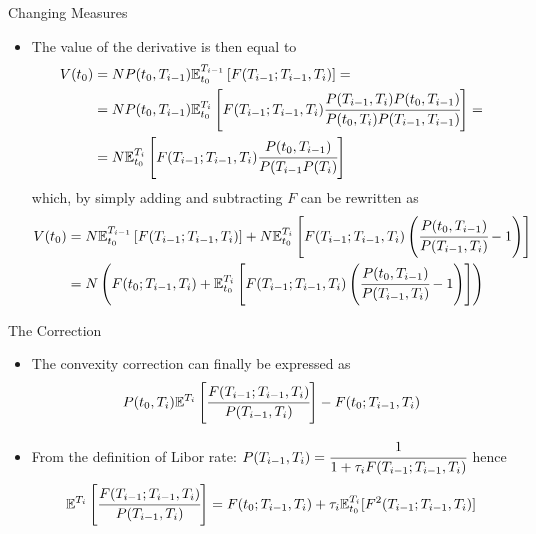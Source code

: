 \documentclass{beamer}
\begin{document}
\begin{frame}{Changing Measures}
\begin{itemize}
\item The value of the derivative is then equal to
\begin{equation}
\begin{aligned}
V(t_0) &= N P(t_0,T_{i-1})\mathbb{E}^{T_{i-1}}_{t_0}\left[F(T_{i-1};T_{i-1},T_i)\right] = \\
&=N P(t_0,T_{i-1})\mathbb{E}^{T_i}_{t_0}\left[F(T_{i-1};T_{i-1},T_i)\cfrac{P(T_{i-1},T_i)P(t_0,T_{i-1})}{P(t_0,T_i)P(T_{i-1},T_{i-1})}\right]=\\
&=N \mathbb{E}^{T_i}_{t_0}\left[F(T_{i-1};T_{i-1},T_i)\cfrac{P(t_0,T_{i-1})}{P(T_{i-1}P(T_i)}\right]\\
\end{aligned}
\end{equation}
which, by simply adding and subtracting $F$ can be rewritten as 
\begin{equation}
\begin{aligned}
V(t_0) &= N \mathbb{E}^{T_{i-1}}_{t_0}\left[F(T_{i-1};T_{i-1},T_i)\right] + N \mathbb{E}^{T_i}_{t_0}\left[F(T_{i-1};T_{i-1},T_i)\left(\cfrac{P(t_0,T_{i-1})}{P(T_{i-1}, T_i)}-1\right)\right]\\
&=N\left(F(t_0;T_{i-1},T_i) + \mathbb{E}^{T_i}_{t_0}\left[F(T_{i-1};T_{i-1},T_i)\left(\cfrac{P(t_0,T_{i-1})}{P(T_{i-1}, T_i)}-1\right)\right]\right)
\end{aligned}
\end{equation}
\end{itemize}
\end{frame}

\begin{frame}{The Correction}
\begin{itemize}
\item The convexity correction can finally be expressed as
\begin{equation}
P(t_0,T_i)\mathbb{E}^{T_i}\left[\cfrac{F(T_{i-1};T_{i-1},T_i)}{P(T_{i-1},T_i)}\right]-F(t_0;T_{i-1},T_i)
\end{equation}
\item From the definition of Libor rate: $P(T_{i-1},T_i)=\cfrac{1}{1+\tau_i F(T_{i-1};T_{i-1},T_i)}$ hence
\begin{equation}
\mathbb{E}^{T_i}\left[\cfrac{F(T_{i-1};T_{i-1},T_i)}{P(T_{i-1},T_i)}\right]=F(t_0;T_{i-1},T_i)+\tau_i\mathbb{E}^{T_i}_{t_0}[F^2(T_{i-1};T_{i-1},T_i)]
\end{equation}
\end{itemize}
\end{frame}
\end{document}
